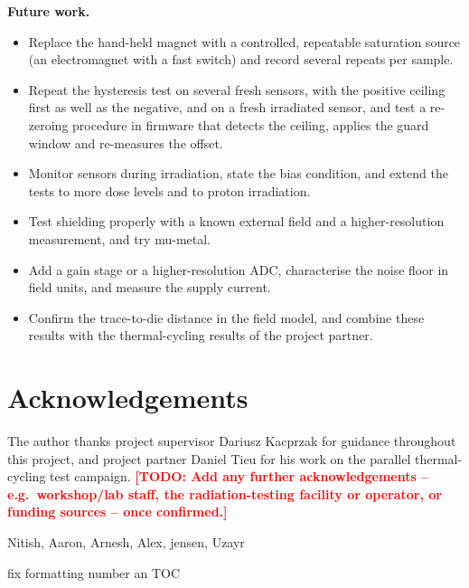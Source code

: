 \documentclass[12pt,a4paper]{article}
\newcommand{\todo}[1]{\textcolor{red}{\textbf{[TODO: #1]}}}
\begin{document}
\textbf{Future work.}
\begin{itemize}
\item Replace the hand-held magnet with a controlled, repeatable saturation source (an electromagnet with a fast switch) and record several repeats per sample.
\item Repeat the hysteresis test on several fresh sensors, with the positive ceiling first as well as the negative, and on a fresh irradiated sensor, and test a re-zeroing procedure in firmware that detects the ceiling, applies the guard window and re-measures the offset.
\item Monitor sensors during irradiation, state the bias condition, and extend the tests to more dose levels and to proton irradiation.
\item Test shielding properly with a known external field and a higher-resolution measurement, and try mu-metal.
\item Add a gain stage or a higher-resolution ADC, characterise the noise floor in field units, and measure the supply current.
\item Confirm the trace-to-die distance in the field model, and combine these results with the thermal-cycling results of the project partner.
\end{itemize}

\clearpage

\section*{Acknowledgements}

The author thanks project supervisor Dariusz Kacprzak for guidance throughout this project, and project partner Daniel Tieu for his work on the parallel thermal-cycling test campaign. \todo{Add any further acknowledgements -- e.g.\ workshop/lab staff, the radiation-testing facility or operator, or funding sources -- once confirmed.}

Nitish, Aaron, Arnesh, Alex, jensen, Uzayr

fix formatting number an TOC

\clearpage
\end{document}
